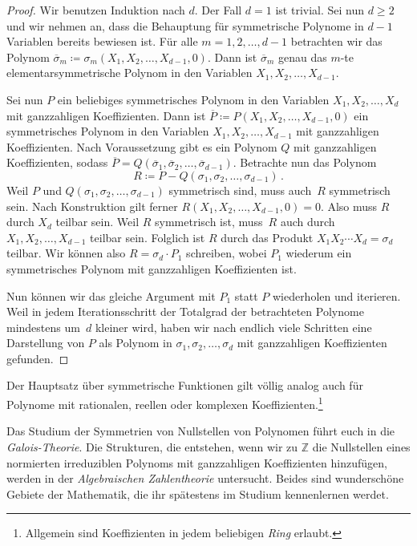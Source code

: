\begin{proof}
	Wir benutzen Induktion nach $d$. Der Fall $d=1$ ist trivial. Sei nun $d\geqslant 2$ und wir nehmen an, dass die Behauptung für symmetrische Polynome in $d-1$ Variablen bereits bewiesen ist. Für alle $m=1,2,\dotsc,d-1$ betrachten wir das Polynom $\overline{\sigma}_m\coloneqq \sigma_m(X_1,X_2,\dotsc,X_{d-1},0)$. Dann ist $\overline{\sigma}_m$ genau das $m$-te elementarsymmetrische Polynom in den Variablen $X_1,X_2,\dotsc,X_{d-1}$.
	
	Sei nun $P$ ein beliebiges symmetrisches Polynom in den Variablen $X_1,X_2,\dotsc,X_d$ mit ganzzahligen Koeffizienten. Dann ist $\overline{P}\coloneqq P(X_1,X_2,\dotsc,X_{d-1},0)$ ein symmetrisches Polynom in den Variablen $X_1,X_2,\dotsc,X_{d-1}$ mit ganzzahligen Koeffizienten. Nach Voraussetzung gibt es ein Polynom $Q$ mit ganzzahligen Koeffizienten, sodass $\overline{P}=Q(\overline{\sigma}_1,\overline{\sigma}_2,\dotsc,\overline{\sigma}_{d-1})$. Betrachte nun das Polynom
	\begin{equation*}
		R\coloneqq P-Q(\sigma_1,\sigma_2,\dotsc,\sigma_{d-1})\,.
	\end{equation*}
	Weil $P$ und $Q(\sigma_1,\sigma_2,\dotsc,\sigma_{d-1})$ symmetrisch sind, muss auch~$R$ symmetrisch sein. Nach Konstruktion gilt ferner $R(X_1,X_2,\dotsc,X_{d-1},0)=0$. Also muss $R$ durch $X_d$ teilbar sein. Weil $R$ symmetrisch ist, muss~$R$ auch durch $X_1,X_2,\dotsc,X_{d-1}$ teilbar sein. Folglich ist $R$ durch das Produkt $X_1X_2\dotsm X_d=\sigma_d$ teilbar. Wir können also $R=\sigma_d\cdot P_1$ schreiben, wobei $P_1$ wiederum ein symmetrisches Polynom mit ganzzahligen Koeffizienten ist.
	
	Nun können wir das gleiche Argument mit $P_1$ statt $P$ wiederholen und iterieren. Weil in jedem Iterationsschritt der Totalgrad der betrachteten Polynome mindestens um~$d$ kleiner wird, haben wir nach endlich viele Schritten eine Darstellung von $P$ als Polynom in $\sigma_1,\sigma_2,\dotsc,\sigma_d$ mit ganzzahligen Koeffizienten gefunden.
\end{proof}

Der Hauptsatz über symmetrische Funktionen gilt völlig analog auch für Polynome mit rationalen, reellen oder komplexen Koeffizienten.\footnote{Allgemein sind Koeffizienten in jedem beliebigen \emph{Ring} erlaubt.}

Das Studium der Symmetrien von Nullstellen von Polynomen führt euch in die \emph{Galois-Theorie}. Die Strukturen, die entstehen, wenn wir zu $\mathbb Z$ die Nullstellen eines normierten irreduziblen Polynoms mit ganzzahligen Koeffizienten hinzufügen, werden in der \emph{Algebraischen Zahlentheorie} untersucht. Beides sind wunderschöne Gebiete der Mathematik, die ihr spätestens im Studium kennenlernen werdet.

